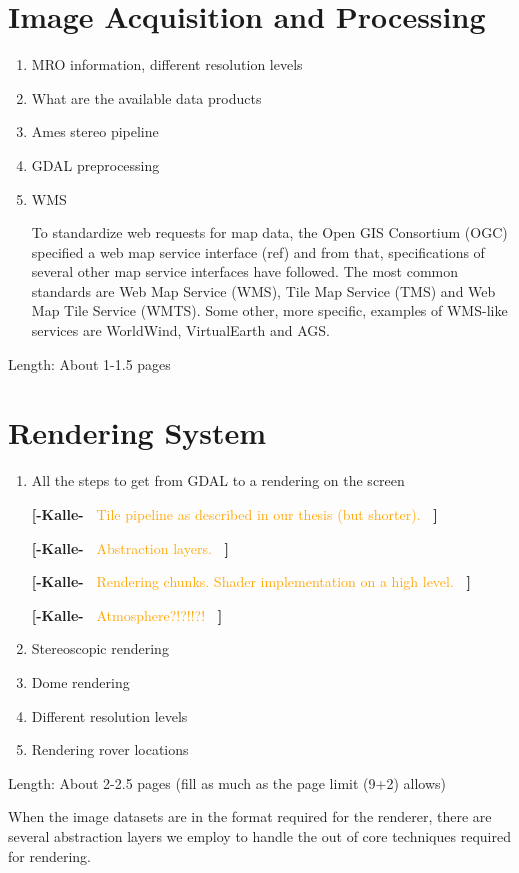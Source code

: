 \documentclass[journal]{vgtc}                %
\newcommand{\kallecomment}[1]{\textbf{[-Kalle-~}
    \textcolor{orange}{#1}
    \textbf{~]}}
\begin{document}
\section{Image Acquisition and Processing} \label{sec:imageacquisitionprocessing}
\begin{enumerate}
  \item MRO information, different resolution levels
  \item What are the available data products
  \item Ames stereo pipeline
  \item GDAL preprocessing
  \item WMS

To standardize web requests for map data, the Open GIS Consortium (OGC) specified a web map service interface (ref) and from that, specifications of several other map service interfaces have followed.
The most common standards are Web Map Service (WMS), Tile Map Service (TMS) and Web Map Tile Service (WMTS). Some other, more specific, examples of WMS-like services are WorldWind, VirtualEarth and AGS.
  
\end{enumerate}
Length: About 1-1.5 pages

\section{Rendering System} \label{sec:renderingsystem}


\begin{enumerate}
  \item All the steps to get from GDAL to a rendering on the screen
  
  \kallecomment{Tile pipeline as described in our thesis (but shorter).}
  
  \kallecomment{Abstraction layers.}
  
  \kallecomment{Rendering chunks. Shader implementation on a high level.}
  
  \kallecomment{Atmosphere?!?!!?!}
  
  \item Stereoscopic rendering
  \item Dome rendering
  \item Different resolution levels
  \item Rendering rover locations
\end{enumerate}
Length: About 2-2.5 pages (fill as much as the page limit (9+2) allows)


When the image datasets are in the format required for the renderer, there are several abstraction layers we employ to handle the out of core techniques required for rendering.
\end{document}
